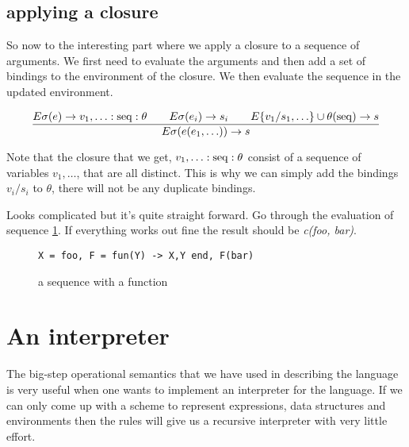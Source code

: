 \documentclass[a4paper,11pt]{article}
\begin{document}
\subsection{applying a closure}

So now to the interesting part where we apply a closure to a sequence
of arguments. We first need to evaluate the arguments and then add a
set of bindings to the environment of the closure. We then evaluate
the sequence in the updated environment.

$$\frac{E\sigma(e) \rightarrow v_1, \ldots:{\rm seq}:\theta \qquad E\sigma(e_i) \rightarrow s_i \qquad E\{v_1/s_1, \ldots\}\cup\theta({\rm seq}) \rightarrow s}{
E\sigma(e(e_1, \ldots)) \rightarrow s}$$ 

Note that the closure that we get, $v_1, \ldots:{\rm seq}:\theta$
consist of a sequence of variables $v_1, \ldots$, that are all
distinct. This is why we can simply add the bindings
$v_i/s_i$ to $\theta$, there will not be any duplicate bindings.

Looks complicated but it's quite straight forward. Go through the
evaluation of sequence \ref{fig:seq2}. If everything works out fine
the result should be {\em c(foo, bar)}.

\begin{figure}[ht]
\center
{\tt X = foo, F = fun(Y) -> {X,Y} end,  F(bar)}
\caption{a sequence with a function}
\label{fig:seq2}
\end{figure}

\section{An interpreter}

The big-step operational semantics that we have used in describing the
language is very useful when one wants to implement an interpreter
for the language. If we can only come up with a scheme to represent
expressions, data structures and environments then the rules will give
us a recursive interpreter with very little effort.
\end{document}
